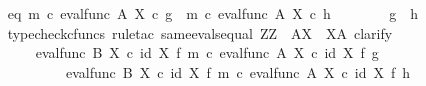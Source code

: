 \begin{isabellebody}
\isanewline
\ \ \ \ \ \ \isamarkupfalse%
\ eq{\isacharcolon}{\kern0pt}\ {\isachardoublequoteopen}{\isacharparenleft}{\kern0pt}m\ {\isasymcirc}\isactrlsub c\ eval{\isacharunderscore}{\kern0pt}func\ A\ X{\isacharparenright}{\kern0pt}\isactrlsup {\isasymsharp}\ {\isasymcirc}\isactrlsub c\ g\ {\isacharequal}{\kern0pt}\ {\isacharparenleft}{\kern0pt}m\ {\isasymcirc}\isactrlsub c\ eval{\isacharunderscore}{\kern0pt}func\ A\ X{\isacharparenright}{\kern0pt}\isactrlsup {\isasymsharp}\ {\isasymcirc}\isactrlsub c\ h{\isachardoublequoteclose}\isanewline
\ \ \ \ \ \ \isamarkupfalse%
\ {\isachardoublequoteopen}g\ {\isacharequal}{\kern0pt}\ h{\isachardoublequoteclose}\isanewline
\ \ \ \ \ \ \isamarkupfalse%
\ {\isacharparenleft}{\kern0pt}typecheck{\isacharunderscore}{\kern0pt}cfuncs{\isacharcomma}{\kern0pt}\ rule{\isacharunderscore}{\kern0pt}tac\ same{\isacharunderscore}{\kern0pt}evals{\isacharunderscore}{\kern0pt}equal{\isacharbrackleft}{\kern0pt}\ Z{\isacharequal}{\kern0pt}Z{\isacharcomma}{\kern0pt}\ \ A{\isacharequal}{\kern0pt}X{\isacharcomma}{\kern0pt}\ \ X{\isacharequal}{\kern0pt}A{\isacharbrackright}{\kern0pt}{\isacharcomma}{\kern0pt}\ clarify{\isacharparenright}{\kern0pt}\isanewline
\ \ \ \ \ \ \ \ \ \ \isamarkupfalse%
\ {\isachardoublequoteopen}{\isacharparenleft}{\kern0pt}{\isacharparenleft}{\kern0pt}eval{\isacharunderscore}{\kern0pt}func\ B\ X{\isacharparenright}{\kern0pt}\ {\isasymcirc}\isactrlsub c\ {\isacharparenleft}{\kern0pt}id\ X\ {\isasymtimes}\isactrlsub f\ {\isacharparenleft}{\kern0pt}m\ {\isasymcirc}\isactrlsub c\ eval{\isacharunderscore}{\kern0pt}func\ A\ X{\isacharparenright}{\kern0pt}\isactrlsup {\isasymsharp}{\isacharparenright}{\kern0pt}{\isacharparenright}{\kern0pt}\ {\isasymcirc}\isactrlsub c\ {\isacharparenleft}{\kern0pt}id\ X\ {\isasymtimes}\isactrlsub f\ g{\isacharparenright}{\kern0pt}\ \ {\isacharequal}{\kern0pt}\ \isanewline
\ \ \ \ \ \ \ \ \ \ \ \ \ \ \ \ {\isacharparenleft}{\kern0pt}{\isacharparenleft}{\kern0pt}eval{\isacharunderscore}{\kern0pt}func\ B\ X{\isacharparenright}{\kern0pt}\ {\isasymcirc}\isactrlsub c\ {\isacharparenleft}{\kern0pt}id\ X\ {\isasymtimes}\isactrlsub f\ {\isacharparenleft}{\kern0pt}m\ {\isasymcirc}\isactrlsub c\ eval{\isacharunderscore}{\kern0pt}func\ A\ X{\isacharparenright}{\kern0pt}\isactrlsup {\isasymsharp}{\isacharparenright}{\kern0pt}{\isacharparenright}{\kern0pt}\ {\isasymcirc}\isactrlsub c\ {\isacharparenleft}{\kern0pt}id\ X\ {\isasymtimes}\isactrlsub f\ h{\isacharparenright}{\kern0pt}{\isachardoublequoteclose}\isanewline

\end{isabellebody}
